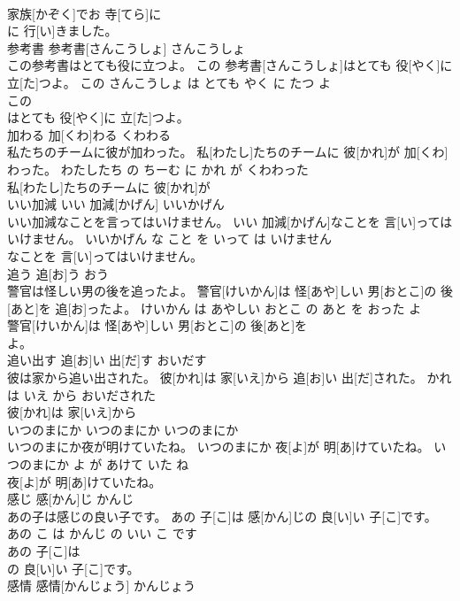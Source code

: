 \documentclass[8pt]{extreport}
\begin{document}
\begin{CJK}{UTF8}{min}
\\	家族[かぞく]でお 寺[てら]に
\\	に 行[い]きました。			
\\	参考書	参考書[さんこうしょ]	さんこうしょ	
\\	この参考書はとても役に立つよ。	この 参考書[さんこうしょ]はとても 役[やく]に 立[た]つよ。	この さんこうしょ は とても やく に たつ よ	
\\	この
\\	はとても 役[やく]に 立[た]つよ。			
\\	加わる	加[くわ]わる	くわわる	
\\	私たちのチームに彼が加わった。	私[わたし]たちのチームに 彼[かれ]が 加[くわ]わった。	わたしたち の ちーむ に かれ が くわわった	
\\	私[わたし]たちのチームに 彼[かれ]が
\\	いい加減	いい 加減[かげん]	いいかげん	
\\	いい加減なことを言ってはいけません。	いい 加減[かげん]なことを 言[い]ってはいけません。	いいかげん な こと を いって は いけません	
\\	なことを 言[い]ってはいけません。			
\\	追う	追[お]う	おう	
\\	警官は怪しい男の後を追ったよ。	警官[けいかん]は 怪[あや]しい 男[おとこ]の 後[あと]を 追[お]ったよ。	けいかん は あやしい おとこ の あと を おった よ	
\\	警官[けいかん]は 怪[あや]しい 男[おとこ]の 後[あと]を
\\	よ。			
\\	追い出す	追[お]い 出[だ]す	おいだす	
\\	彼は家から追い出された。	彼[かれ]は 家[いえ]から 追[お]い 出[だ]された。	かれ は いえ から おいだされた	
\\	彼[かれ]は 家[いえ]から
\\	いつのまにか	いつのまにか	いつのまにか	
\\	いつのまにか夜が明けていたね。	いつのまにか 夜[よ]が 明[あ]けていたね。	いつのまにか よ が あけて いた ね	
\\	夜[よ]が 明[あ]けていたね。			
\\	感じ	感[かん]じ	かんじ	
\\	あの子は感じの良い子です。	あの 子[こ]は 感[かん]じの 良[い]い 子[こ]です。	あの こ は かんじ の いい こ です	
\\	あの 子[こ]は
\\	の 良[い]い 子[こ]です。			
\\	感情	感情[かんじょう]	かんじょう	

\end{CJK}
\end{document}
